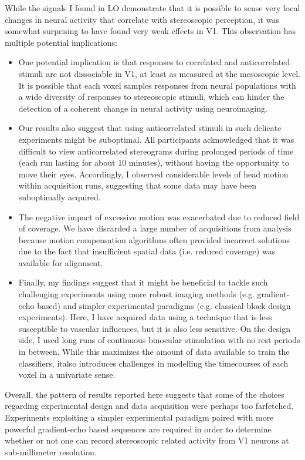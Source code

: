 While the signals I found in LO demonstrate that it is possible to sense very local changes in neural activity that correlate with stereoscopic perception, it was somewhat surprising to have found very weak effects in V1. This observation has multiple potential implications:

\begin{itemize}
  \item One potential implication is that responses to correlated and anticorrelated stimuli are not dissociable in V1, at least as measured at the mesoscopic level. It is possible that each voxel samples responses from neural populations with a wide diversity of responses to stereoscopic stimuli, which can hinder the detection of a coherent change in neural activity using neuroimaging.
  \item Our results also suggest that using anticorrelated stimuli in such delicate experiments might be suboptimal. All participants acknowledged that it was difficult to view anticorrelated stereograms during prolonged periods of time (each run lasting for about 10 minutes), without having the opportunity to move their eyes. Accordingly, I observed considerable levels of head motion within acquisition runs, suggesting that some data may have been suboptimally acquired.
  \item The negative impact of excessive motion was exacerbated due to reduced field of coverage. We have discarded a large number of acquisitions from analysis because motion compensation algorithms often provided incorrect solutions due to the fact that insufficient spatial data (i.e. reduced coverage) was available for alignment.
  \item Finally, my findings suggest that it might be beneficial to tackle such challenging experiments using more robust imaging methods (e.g. gradient-echo based) and simpler experimental paradigms (e.g. classical block design experiments). Here, I have acquired data using a technique that is less susceptible to vascular influences, but it is also less sensitive. On the design side, I used long runs of continuous binocular stimulation with no rest periods in between. While this maximizes the amount of data available to train the classifiers, italso introduces challenges in modelling the timecourses of each voxel in a univariate sense. 
\end{itemize}

Overall, the pattern of results reported here suggests that some of the choices regarding experimental design and data acquisition were perhaps too farfetched. Experiments exploiting a simpler experimental paradigm paired with more powerful gradient-echo based sequences are required in order to determine whether or not one can record stereoscopic related activity from V1 neurons at sub-millimeter resolution.  

